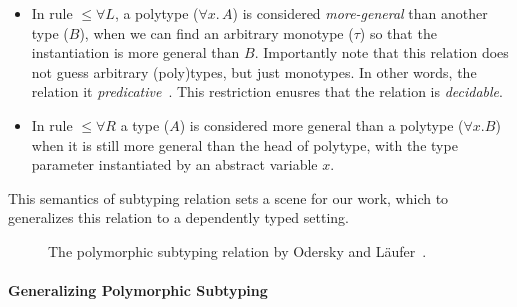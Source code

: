 \begin{itemize}
  \item In rule $\le\forall L$, a polytype ($\forall x.\, A$) is considered \emph{more-general}
        than another type ($B$), when we can find an arbitrary monotype ($\tau$)
        so that the instantiation is more general than $B$.
        Importantly note that this relation does not guess arbitrary (poly)types,
        but just monotypes. In other words, the relation it \emph{predicative}~\cite{}.
        This restriction enusres that the relation is \emph{decidable}.
  \item In rule  $\le\forall R$ a type ($A$) is considered more general than a polytype ($\forall x. B$)
        when it is still more general than the head of polytype, with the type
        parameter instantiated by an abstract variable $x$.
\end{itemize}

This semantics of subtyping relation sets a scene for our work, which
to generalizes this relation to a dependently typed setting.

\begin{figure}
\centering


\caption{The polymorphic subtyping relation by Odersky and L\"aufer~\cite{odersky1996putting}.}
\label{fig:polymorphic-subtyping}
\end{figure}


\paragraph{Generalizing Polymorphic Subtyping}
\label{sec:polymorphic-subtyping}

